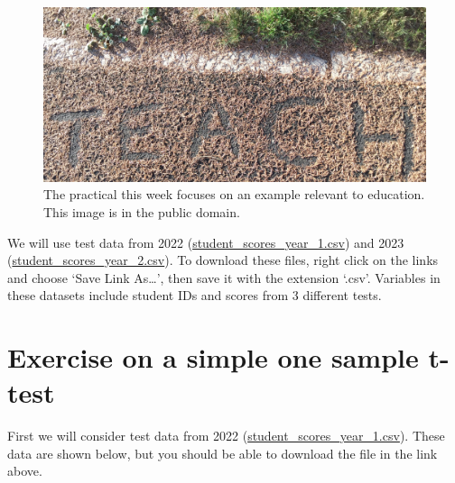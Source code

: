 \documentclass[
]{scrbook}
\begin{document}
\begin{figure}
\includegraphics[width=1\linewidth]{img/teaching} \caption{The practical this week focuses on an example relevant to education. This image is in the public domain.}\label{fig:unnamed-chunk-97}
\end{figure}

We will use test data from 2022 (\href{https://raw.githubusercontent.com/bradduthie/statistical_techniques/main/data/student_scores_year_1.csv}{student\_scores\_year\_1.csv}) and 2023 (\href{https://raw.githubusercontent.com/bradduthie/statistical_techniques/main/data/student_scores_year_2.csv}{student\_scores\_year\_2.csv}).
To download these files, right click on the links and choose `Save Link As\ldots{}', then save it with the extension `.csv'.
Variables in these datasets include student IDs and scores from 3 different tests.

\hypertarget{exercise-on-a-simple-one-sample-t-test}{%
\section{Exercise on a simple one sample t-test}\label{exercise-on-a-simple-one-sample-t-test}}

First we will consider test data from 2022 (\href{https://raw.githubusercontent.com/bradduthie/SCIU4T4/main/data/student_scores_year_1.csv}{student\_scores\_year\_1.csv}).
These data are shown below, but you should be able to download the file in the link above.
\end{document}
